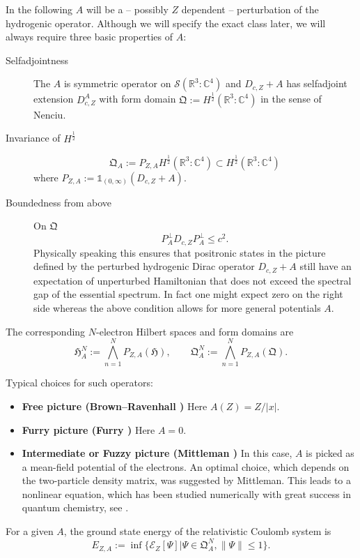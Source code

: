 \documentclass[a4paper]{amsart}
\def\1{{\mathds{1}}}
\def\cE{{\mathcal E}}
\def\cS{{\mathcal S}}
\def\gH{\mathfrak{H}}
\def\gQ{\mathfrak{Q}}
\def\cz{\mathbb{C}} %
\def\rz{\mathbb{R}} %
\def\atp{\bigwedge\limits} %
\begin{document}
In the following $A$ will be a -- possibly $Z$ dependent -- perturbation
of the hydrogenic operator. Although we will specify the exact class
later, we will always require three basic properties of $A$:
\begin{description}
\item[Selfadjointness] The $A$ is symmetric operator on
  $\cS(\rz^3:\cz^4)$ and $D_{c,Z}+A$ has selfadjoint extension
  $D_{c,Z}^A$ with form domain $\gQ:=H^\frac12(\rz^3:\cz^4)$ in the
  sense of Nenciu.
\item[Invariance of $H^\frac12$]
\begin{equation}
  \label{eq:P}
  \gQ_A:=P_{Z,A}H^\frac12(\rz^3:\cz^4)\subset H^\frac12(\rz^3:\cz^4)
\end{equation}
where $P_{Z,A}:= \1_{(0,\infty)}(D_{c,Z}+A)$.
\item[Boundedness from above] 
  On $\gQ$
  \begin{equation}
    \label{boundedness}
    P_A^\perp D_{c,Z}P_A^\perp \leq c^2.
  \end{equation}
  Physically speaking this ensures that positronic states in the
  picture defined by the perturbed hydrogenic Dirac operator
  $D_{c,Z}+A$ still have an expectation of unperturbed Hamiltonian
  that does not exceed the spectral gap of the essential spectrum. In
  fact one might expect zero on the right side whereas the above
  condition allows for more general potentials $A$.
\end{description}
The corresponding $N$-electron Hilbert spaces and form domains are
\begin{equation}
  \gH^N_A:=\atp_{n=1}^N  P_{Z,A}(\gH),\qquad \gQ^N_A:=\atp_{n=1}^N P_{Z,A}(\gQ).
\end{equation}

Typical choices for such operators:
\begin{itemize}
\item {\bf Free picture (Brown--Ravenhall \cite{BrownRavenhall1951})}
  Here $A(Z)= Z/|x|$.
\item {\bf Furry picture (Furry \cite{Furry1951})} Here
  $A=0$.
\item {\bf Intermediate or Fuzzy picture (Mittleman
    \cite{Mittleman1981})} In this case, $A$ is picked as a mean-field
  potential of the electrons. An optimal choice, which
  depends on the two-particle density matrix, was suggested by
  Mittleman. This leads to a nonlinear equation, which has been
  studied numerically with great success in quantum chemistry, see
  \cite{Saue2011}.
\end{itemize}
For a given $A$, the ground state energy of the relativistic
Coulomb system is 
\begin{equation}
  E_{Z,A}:=\inf\{\cE_{Z}[\Psi]\big|\Psi\in \gQ^N_A, \|\Psi\|\leq 1\}.
\end{equation}
\end{document}
